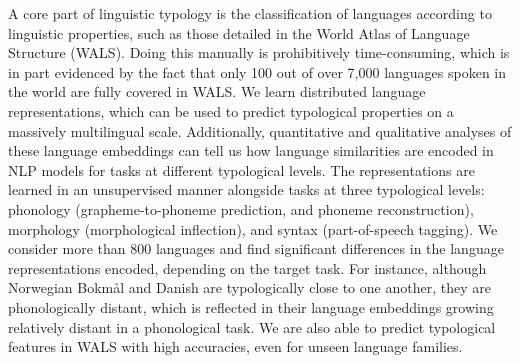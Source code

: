 A core part of linguistic typology is the classification of languages according to linguistic properties, such as those detailed in the World Atlas of Language Structure (WALS). Doing this manually is prohibitively time-consuming, which is in part evidenced by the fact that only 100 out of over 7,000 languages spoken in the world are fully covered in WALS. We learn distributed language representations, which can be used to predict typological properties on a massively multilingual scale. Additionally, quantitative and qualitative analyses of these language embeddings can tell us how language similarities are encoded in NLP models for tasks at different typological levels. The representations are learned in an unsupervised manner alongside tasks at three typological levels: phonology (grapheme-to-phoneme prediction, and phoneme reconstruction), morphology (morphological inflection), and syntax (part-of-speech tagging). We consider more than 800 languages and find significant differences in the language representations encoded, depending on the target task. For instance, although Norwegian Bokmål and Danish are typologically close to one another, they are phonologically distant, which is reflected in their language embeddings growing relatively distant in a phonological task. We are also able to predict typological features in WALS with high accuracies, even for unseen language families.
